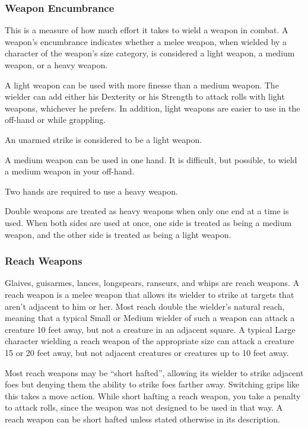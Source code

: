 \subsubsection{Weapon Encumbrance}
This is a measure of how much effort it takes to wield a weapon in combat. A weapon's encumbrance indicates whether a melee weapon, when wielded by a character of the weapon's size category, is considered a light weapon, a medium weapon, or a heavy weapon.

 A light weapon can be used with more finesse than a medium weapon. The wielder can add either his Dexterity or his Strength to attack rolls with light weapons, whichever he prefers. In addition, light weapons are easier to use in the off-hand or while grappling.

An unarmed strike is considered to be a light weapon.

 A medium weapon can be used in one hand. It is difficult, but possible, to wield a medium weapon in your off-hand.

 Two hands are required to use a heavy weapon.

 Double weapons are treated as heavy weapons when only one end at a time is used. When both sides are used at once, one side is treated as being a medium weapon, and the other side is treated as being a light weapon.

\subsubsection{Reach Weapons}
Glaives, guisarmes, lances, longspears, ranseurs, and whips are reach weapons. A reach weapon is a melee weapon that allows its wielder to strike at targets that aren't adjacent to him or her. Most reach double the wielder's natural reach, meaning that a typical Small or Medium wielder of such a weapon can attack a creature 10 feet away, but not a creature in an adjacent square. A typical Large character wielding a reach weapon of the appropriate size can attack a creature 15 or 20 feet away, but not adjacent creatures or creatures up to 10 feet away.

\par Most reach weapons may be ``short hafted'', allowing its wielder to strike adjacent foes but denying them the ability to strike foes farther away. Switching grips like this takes a move action. While short hafting a reach weapon, you take a  penalty to attack rolls, since the weapon was not designed to be used in that way. A reach weapon can be short hafted unless stated otherwise in its description.

